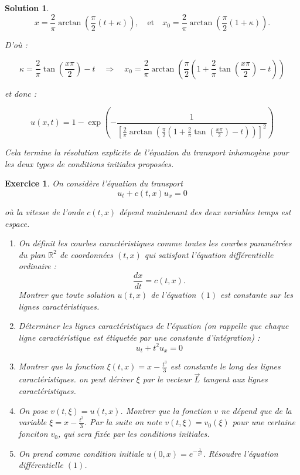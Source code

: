 \documentclass[10pt]{article}
\theoremstyle{frenchstyle}
\newtheorem{solution}{Solution}
\newtheorem{exercice}{Exercice}
\newcommand{\R}{\mathbb{R}}
\begin{document}
\begin{solution}
	\[
		x = \frac{2}{\pi} \arctan\left( \frac{\pi}{2}(t + \kappa) \right), \quad \text{et} \quad x_0 = \frac{2}{\pi} \arctan\left( \frac{\pi}{2}(1 + \kappa) \right).
	\]

	D'où :

	\[
		\kappa = \frac{2}{\pi} \tan\left( \frac{x\pi}{2} \right) - t \quad \Rightarrow \quad x_0 = \frac{2}{\pi} \arctan\left( \frac{\pi}{2} \left( 1 + \frac{2}{\pi} \tan\left( \frac{x\pi}{2} \right) - t \right) \right)
	\]

	et donc :

	\[
		u(x, t) = 1 - \exp\left( -\frac{1}{\left[ \frac{2}{\pi} \arctan\left( \frac{\pi}{2} \left( 1 + \frac{2}{\pi} \tan\left( \frac{x\pi}{2} \right) - t \right) \right) \right]^2} \right)
	\]

	Cela termine la résolution explicite de l'équation du transport inhomogène pour les deux types de conditions initiales proposées.
\end{solution}

\newpage

\begin{exercice}
	On considère l’équation du transport
	\begin{equation}
		u_t + c(t, x)u_x = 0
	\end{equation}

	où la vitesse de l'onde $c(t ,x)$ dépend maintenant des deux variables temps est espace.

	\begin{enumerate}
		\item On définit les courbes caractéristiques comme toutes les courbes paramétrées du plan $\R^2$ de coordonnées $(t, x)$ qui satisfont l'équation différentielle ordinaire :
		      \[
			      \frac{dx}{dt} = c(t, x).
		      \]
		      Montrer que toute solution $u(t ,x)$ de l'équation $(1)$ est constante sur les lignes caractéristiques.
		\item Déterminer les lignes caractéristiques de l’équation (on rappelle que chaque ligne caractéristique est étiquetée par une constante d’intégration) :
		      \begin{equation}
			      u_t + t^2u_x = 0
		      \end{equation}
		\item Montrer que la fonction $\xi(t,x) = x - \frac{t^3}{3}$ est constante le long des lignes caractéristiques. \textit{on peut dériver $\xi$ par le vecteur $\vec{L}$ tangent aux lignes caractéristiques.}
		\item On pose $v(t, \xi) = u(t, x)$. Montrer que la fonction $v$ ne  dépend que de la variable $\xi = x - \frac{t^3}{3}$. Par la suite on note $v(t, \xi) = v_0(\xi)$ pour une certaine fonciton $v_0$, qui sera fixée par les conditions initiales.
		\item On prend comme condition initiale $u(0,x)=e^{-\frac{1}{x^2}}$. Résoudre l'équation différentielle $(1)$.
	\end{enumerate}
\end{exercice}
\end{document}
